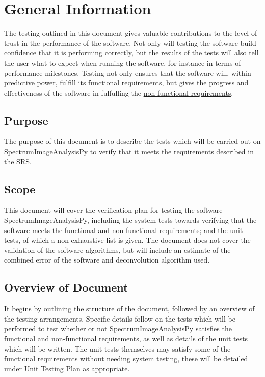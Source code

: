 \documentclass[12pt, titlepage]{article}
\newcommand{\progname}{SpectrumImageAnalysisPy}
\begin{document}
\section{General Information}
The testing outlined in this document gives valuable contributions to the level
of trust in the performance of the software. Not only will testing the software
build confidence that it is performing correctly, but the results of the tests
will also tell the user what to expect when running the software, for instance
in terms of performance milestones. Testing not only ensures that the software
will, within predictive power, fulfill its \hyperref[subsec:FR]{functional
requirements}, but gives the progress and effectiveness of the software in
fulfulling the \hyperref[subsec:NfR]{non-functional requirements}.

\subsection{Purpose}
The purpose of this document is to describe the tests which will be carried out
on \progname{} to verify that it meets the requirements described in the
\hyperref[doc:SRS]{SRS}.

\subsection{Scope}
This document will cover the verification plan for testing the software
\progname{}, including the system tests towards verifying that the software
meets the functional and non-functional requirements; and the unit tests, of
which a non-exhaustive list is given. The document does not cover the validation
of the software algorithms, but will include an estimate of the combined error
of the software and deconvolution algorithm used. 

\subsection{Overview of Document}
 It begins by outlining the structure of the document, followed by an overview
of the testing arrangements. Specific details follow on the tests which will be
performed to test whether or not \progname{} satisfies the
\hyperref[subsec:FuncReqTest]{functional} and
\hyperref[subsec:NonfuncReqTest]{non-functional} requirements, as well as
details of the unit tests which will be written. The unit tests themselves may
satisfy some of the functional requirements without needing system testing,
these will be detailed under \hyperref[sec:UnitTest]{Unit Testing Plan} as
appropriate.
\end{document}
